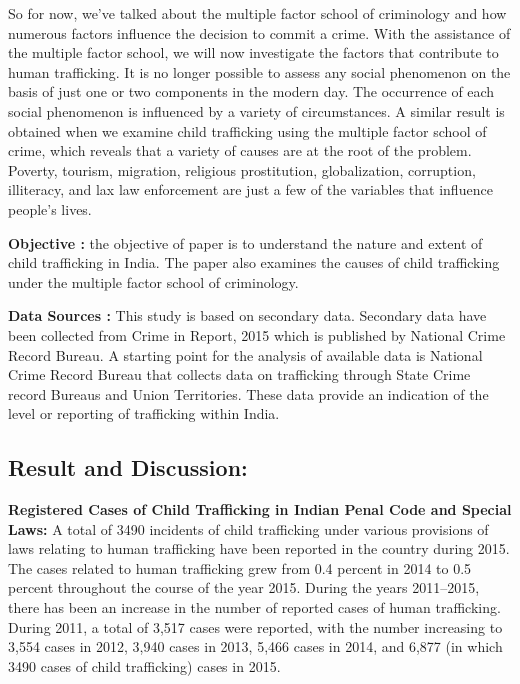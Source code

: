 \vspace{-.3cm}

\begin{multicols}{2}

\noi
So for now, we've talked about the multiple factor school of criminology and how
numerous factors influence the decision to commit a crime. With the assistance of the
multiple factor school, we will now investigate the factors that contribute to human
trafficking. It is no longer possible to assess any social phenomenon on the basis of just
one or two components in the modern day. The occurrence of each social phenomenon
is influenced by a variety of circumstances. A similar result is obtained when we
examine child trafficking using the multiple factor school of crime, which reveals that
a variety of causes are at the root of the problem. Poverty, tourism, migration, religious
prostitution, globalization, corruption, illiteracy, and lax law enforcement are just a few
of the variables that influence people's lives.

\noi
\textbf{Objective :} the objective of paper is to understand the nature and extent of child
trafficking in India. The paper also examines the causes of child trafficking under the
multiple factor school of criminology.

\noi
\textbf{Data Sources :} This study is based on secondary data. Secondary data have been
collected from Crime in Report, 2015 which is published by National Crime Record
Bureau. A starting point for the analysis of available data is National Crime Record
Bureau that collects data on trafficking through State Crime record Bureaus and Union Territories. These data provide an indication of the level or reporting of trafficking
within India.

\vspace{-.4cm}

\subsection*{Result and Discussion:}

\vspace{-.2cm}

\noi
\textbf{Registered Cases of Child Trafficking in Indian Penal Code and Special Laws:} A
total of 3490 incidents of child trafficking under various provisions of laws relating to
human trafficking have been reported in the country during 2015. The cases related to
human trafficking grew from 0.4 percent in 2014 to 0.5 percent throughout the course
of the year 2015. During the years 2011–2015, there has been an increase in the number
of reported cases of human trafficking. During 2011, a total of 3,517 cases were
reported, with the number increasing to 3,554 cases in 2012, 3,940 cases in 2013, 5,466
cases in 2014, and 6,877 (in which 3490 cases of child trafficking) cases in 2015.


\end{multicols}
